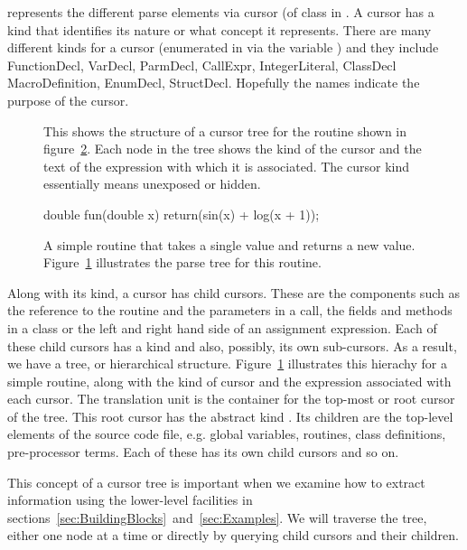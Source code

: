 \libclang{} represents the different parse elements via cursor (of
class  in \R.  A cursor has a kind that identifies
its nature or what concept it represents. There are many different
kinds for a cursor (enumerated in  via the variable
) and they include FunctionDecl, VarDecl, ParmDecl,
CallExpr, IntegerLiteral, ClassDecl MacroDefinition, EnumDecl,
StructDecl.  Hopefully the names indicate the purpose of the cursor.

\begin{figure}
  
\cprotect\caption{This shows the structure of a cursor tree for the 
\C{} routine  shown in figure~\ref{fig:sinLogRoutine}.
Each node in the tree shows the kind of the cursor
and the text of the expression with which it is associated.
The cursor kind  essentially means unexposed or hidden.
}
\label{fig:sinLogTree}  
\end{figure}

\begin{figure}
\centering
\begin{CCode}
              double
              fun(double x)
              {
                 return(sin(x) + log(x + 1));
              }
\end{CCode}  
\caption{A simple routine that takes a single  value
and returns a new value. Figure~\ref{fig:sinLogTree} illustrates the
parse tree for this routine.}\label{fig:sinLogRoutine}
\end{figure}


Along with its kind, a cursor has child cursors.  These are the
components such as the reference to the routine and the parameters in
a call, the fields and methods in a \Cpp{} class or the left and right
hand side of an assignment expression. Each of these child cursors has
a kind and also, possibly, its own sub-cursors. As a result, we have a
tree, or hierarchical structure.  Figure~\ref{fig:sinLogTree}
illustrates this hierachy for a simple routine, along with the kind of
cursor and the expression associated with each cursor.  The
translation unit is the container for the top-most or root cursor of
the tree.  This root cursor has the abstract kind
.  Its children are the top-level elements
of the source code file, e.g. global variables, routines, class
definitions, pre-processor terms. Each of these has its own child
cursors and so on.

This concept of a cursor tree is important when we examine how to
extract information using the lower-level facilities in
sections~\ref{sec:BuildingBlocks}~and~\ref{sec:Examples}.  We will traverse
the tree, either one node at a time or directly by querying child
cursors and their children.

